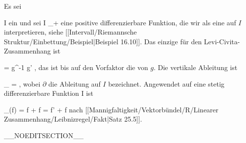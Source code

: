 {

Es sei

\mavergleichskette
{\vergleichskette
{ I
}
{ \subseteq }{ \R
}
{  }{
}
{    }{
}
{   }{
}
}
{}{}{}
ein
und sei
 { I } {\R_+
} {}
eine positive differenzierbare Funktion, die wir als eine
auf $I$ interpretieren, siehe
[[Intervall/Riemannsche Struktur/Einbettung/Beispiel|Beispiel 16.10]].
Das einzige
für den Levi-Civita-Zusammenhang ist

\mavergleichskettedisp
{\vergleichskette
{ \Gamma
}
{ =} { {  }  g^{-1} g'
}
{ } {
}
{ } {
}
{ } {
}
}
{}{}{,}
das ist bis auf den Vorfaktor die
von $g$. Die vertikale Ableitung ist

\mavergleichskettedisp
{\vergleichskette
{ \nabla_\partial \partial
}
{ =} { {  } \partial
}
{ } {
}
{ } {
}
{ } {
}
}
{}{}{,}
wobei $\partial$ die Ableitung auf $I$ bezeichnet. Angewendet auf eine stetig differenzierbare Funktion
 { I } {\R
} {}
 {} {}
ist

\mavergleichskettedisp
{\vergleichskette
{ \nabla_\partial (f)
}
{ =} { \partial f + f  {  }
}
{ =} { f' + f {  }
}
{ } {
}
{ } {
}
}
{}{}{}
nach
[[Mannigfaltigkeit/Vektorbündel/R/Linearer Zusammenhang/Leibnizregel/Fakt|Satz 25.5]].

}

__NOEDITSECTION__

